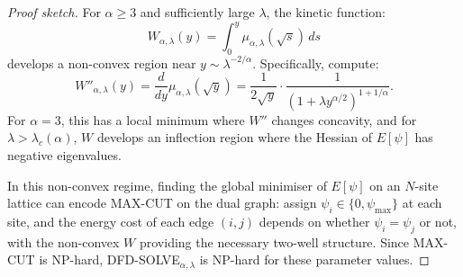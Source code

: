 \documentclass[11pt]{article}
\theoremstyle{definition}
\theoremstyle{remark}
\begin{document}
\begin{proof}[Proof sketch]
For $\alpha \geq 3$ and sufficiently large $\lambda$, the kinetic function:
\begin{equation}
  W_{\alpha,\lambda}(y) = \int_0^y \mu_{\alpha,\lambda}(\sqrt{s})\,ds
\end{equation}
develops a non-convex region near $y \sim \lambda^{-2/\alpha}$. Specifically,
compute:
\begin{equation}
  W''_{\alpha,\lambda}(y) = \frac{d}{dy}\mu_{\alpha,\lambda}(\sqrt{y})
  = \frac{1}{2\sqrt{y}} \cdot \frac{1}{(1 + \lambda y^{\alpha/2})^{1+1/\alpha}}.
\end{equation}
For $\alpha = 3$, this has a local minimum where $W''$ changes
concavity, and for $\lambda > \lambda_c(\alpha)$, $W$ develops an
inflection region where the Hessian of $E[\psi]$ has negative eigenvalues.

In this non-convex regime, finding the global minimiser of $E[\psi]$ on
an $N$-site lattice can encode MAX-CUT on the dual graph: assign
$\psi_i \in \{0, \psi_{\max}\}$ at each site, and the energy cost of
each edge $(i,j)$ depends on whether $\psi_i = \psi_j$ or not, with the
non-convex $W$ providing the necessary two-well structure. Since MAX-CUT
is NP-hard, DFD-SOLVE$_{\alpha,\lambda}$ is NP-hard for these parameter
values.
\end{proof}
\end{document}

